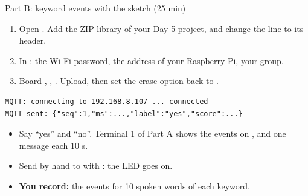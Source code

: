 \begin{frame}[fragile]{Part B: keyword events with the sketch (25 min)}
  \small
  \begin{enumerate}
    \item Open . Add the ZIP library
          of your Day 5 project, and change the  line to
          its header.
    \item In : the Wi-Fi password, the address of
          your Raspberry Pi, your group.
    \item Board , ,
          . Upload,
          then set the erase option back to .
  \end{enumerate}
\begin{lstlisting}[style=shell]
MQTT: connecting to 192.168.8.107 ... connected
MQTT sent: {"seq":1,"ms":...,"label":"yes","score":...}
\end{lstlisting}
  \begin{itemize}
    \item Say ``yes'' and ``no''. Terminal 1 of Part A shows the events on
          , and one  message each
          10 s.
    \item Send  by hand to  with
          : the LED goes on.
    \item \textbf{You record:} the events for 10 spoken words of each
          keyword.
  \end{itemize}
\end{frame}

